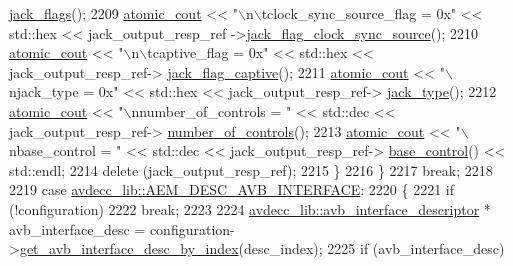 \begin{DoxyCode}
      \hyperlink{classavdecc__lib_1_1jack__output__descriptor__response_ac61cbd97402a059269b432ee38c188a7}{jack\_flags}();
2209             \hyperlink{cmd__line_8h_a0bc38ccc65c79ba06c6fcd7b4bf554c3}{atomic\_cout} << \textcolor{stringliteral}{"\(\backslash\)n\(\backslash\)tclock\_sync\_source\_flag = 0x"} << std::hex << jack\_output\_resp\_ref
      ->\hyperlink{classavdecc__lib_1_1jack__output__descriptor__response_a40688abe228ad246a130e82cc139c502}{jack\_flag\_clock\_sync\_source}();
2210             \hyperlink{cmd__line_8h_a0bc38ccc65c79ba06c6fcd7b4bf554c3}{atomic\_cout} << \textcolor{stringliteral}{"\(\backslash\)n\(\backslash\)tcaptive\_flag = 0x"} << std::hex << jack\_output\_resp\_ref->
      \hyperlink{classavdecc__lib_1_1jack__output__descriptor__response_a9e30c02247953047ebc30d96d984a56a}{jack\_flag\_captive}();
2211             \hyperlink{cmd__line_8h_a0bc38ccc65c79ba06c6fcd7b4bf554c3}{atomic\_cout} << \textcolor{stringliteral}{"\(\backslash\)njack\_type = 0x"} << std::hex << jack\_output\_resp\_ref->
      \hyperlink{classavdecc__lib_1_1jack__output__descriptor__response_a045cc9fc7e74c9040e9e311485691d22}{jack\_type}();
2212             \hyperlink{cmd__line_8h_a0bc38ccc65c79ba06c6fcd7b4bf554c3}{atomic\_cout} << \textcolor{stringliteral}{"\(\backslash\)nnumber\_of\_controls = "} << std::dec << jack\_output\_resp\_ref->
      \hyperlink{classavdecc__lib_1_1jack__output__descriptor__response_a5accf7abc7d231a0767ad5cac68b8b39}{number\_of\_controls}();
2213             \hyperlink{cmd__line_8h_a0bc38ccc65c79ba06c6fcd7b4bf554c3}{atomic\_cout} << \textcolor{stringliteral}{"\(\backslash\)nbase\_control = "} << std::dec << jack\_output\_resp\_ref->
      \hyperlink{classavdecc__lib_1_1jack__output__descriptor__response_ac1f5297533142234c764e84c01ce5a16}{base\_control}() << std::endl;
2214             \textcolor{keyword}{delete} (jack\_output\_resp\_ref);
2215         \}
2216     \}
2217     \textcolor{keywordflow}{break};
2218 
2219     \textcolor{keywordflow}{case} \hyperlink{namespaceavdecc__lib_ac7b7d227e46bc72b63ee9e9aae15902fa5c354fe160628ac90da9257d8e0cb0ee}{avdecc\_lib::AEM\_DESC\_AVB\_INTERFACE}:
2220     \{
2221         \textcolor{keywordflow}{if} (!configuration)
2222             \textcolor{keywordflow}{break};
2223 
2224         \hyperlink{classavdecc__lib_1_1avb__interface__descriptor}{avdecc\_lib::avb\_interface\_descriptor} * avb\_interface\_desc = 
      configuration->\hyperlink{classavdecc__lib_1_1configuration__descriptor_a177c390ccb74a31750b8eb0feb406144}{get\_avb\_interface\_desc\_by\_index}(desc\_index);
2225         \textcolor{keywordflow}{if} (avb\_interface\_desc)

\end{DoxyCode}
